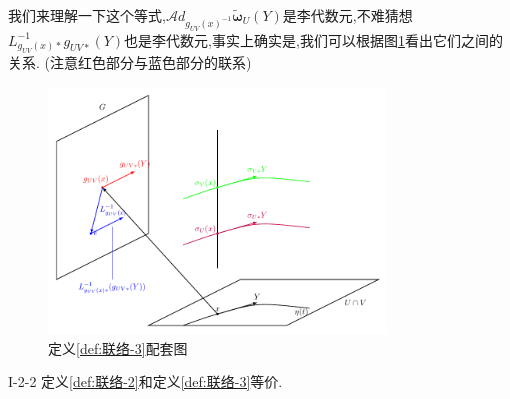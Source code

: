 \documentclass[../main.tex]{subfiles}
\begin{document}
    我们来理解一下这个等式,$\mathscr{A}\!d_{g_{UV}(x)^{-1}}\bm{\tilde{\omega}}_U(Y)$是李代数元,不难猜想$L^{-1}_{g_{UV}(x)*}g_{UV*}(Y)$也是李代数元,事实上确实是,我们可以根据图\ref{fig:I-2-2}看出它们之间的关系.
    (注意红色部分与蓝色部分的联系)
    \begin{figure}[htpb]
      \centering
      \includegraphics[width=0.8\textwidth]{../tikzpicture/I22.pdf}
      \caption{定义\ref{def:联络-3}配套图}
      \label{fig:I-2-2}
    \end{figure}
    \begin{theorem}
      {}{I-2-2}
      定义\ref{def:联络-2}和定义\ref{def:联络-3}等价.
    \end{theorem}
\end{document}
